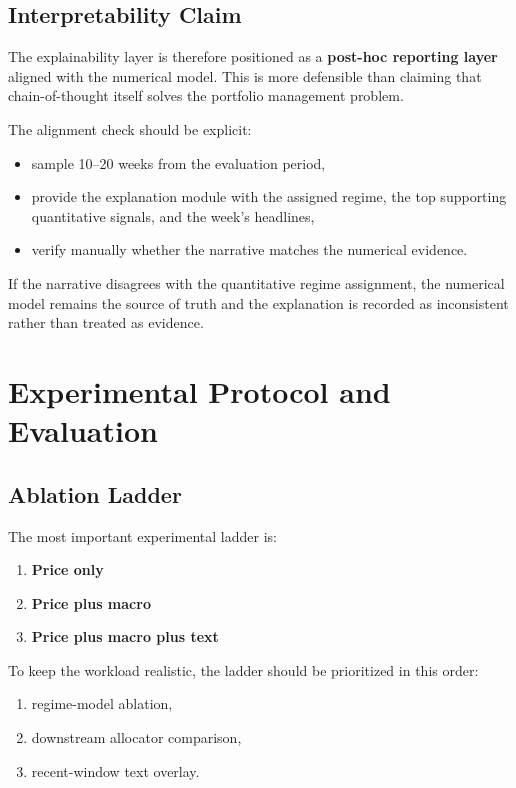 \documentclass[11pt,a4paper]{article}
\begin{document}
\subsection{Interpretability Claim}

The explainability layer is therefore positioned as a \textbf{post-hoc reporting layer} aligned with the numerical model.
This is more defensible than claiming that chain-of-thought itself solves the portfolio management problem.

The alignment check should be explicit:

\begin{itemize}[leftmargin=1.4em]
  \item sample 10--20 weeks from the evaluation period,
  \item provide the explanation module with the assigned regime, the top supporting quantitative signals, and the week's headlines,
  \item verify manually whether the narrative matches the numerical evidence.
\end{itemize}

If the narrative disagrees with the quantitative regime assignment, the numerical model remains the source of truth and the explanation is recorded as inconsistent rather than treated as evidence.

\section{Experimental Protocol and Evaluation}

\subsection{Ablation Ladder}

The most important experimental ladder is:

\begin{enumerate}[leftmargin=1.5em]
  \item \textbf{Price only}
  \item \textbf{Price plus macro}
  \item \textbf{Price plus macro plus text}
\end{enumerate}

To keep the workload realistic, the ladder should be prioritized in this order:

\begin{enumerate}[leftmargin=1.5em]
  \item regime-model ablation,
  \item downstream allocator comparison,
  \item recent-window text overlay.
\end{enumerate}
\end{document}

